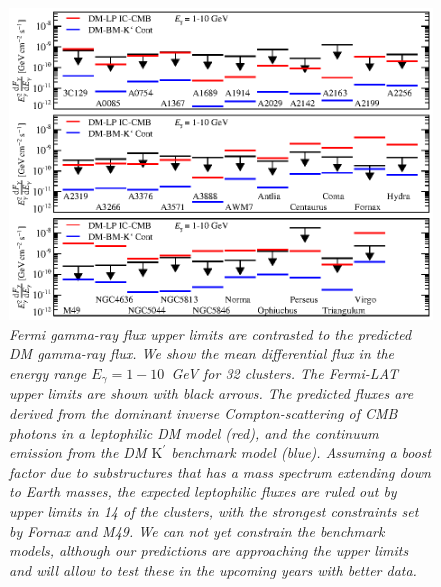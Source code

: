 \documentclass[10pt,aps,pra,reprint,amsmath,amsfonts,amssymb,showpacs,nofootinbib,floatfix]{revtex4-1}
\newcommand{\rmn}{\mathrm}
\newcommand{\Kp}{\rmn{K}^\prime}
\begin{document}
\begin{figure}
\begin{minipage}{2.0\columnwidth}
  \includegraphics[width=0.99\columnwidth]{figures/Fermi.comp.DM.eps}
  \caption{\it Fermi gamma-ray flux upper limits are contrasted to the
    predicted DM gamma-ray flux. We show the mean differential flux in
    the energy range $E_\gamma=1-10$~GeV for 32 clusters. The
    Fermi-LAT upper limits are shown with black arrows. The predicted
    fluxes are derived from the dominant inverse Compton-scattering of
    CMB photons in a leptophilic DM model (red), and the continuum
    emission from the DM $\Kp$ benchmark model (blue). Assuming a
    boost factor due to substructures that has a mass spectrum
    extending down to Earth masses, the expected leptophilic fluxes
    are ruled out by upper limits in 14 of the clusters, with the
    strongest constraints set by Fornax and M49. We can not yet
    constrain the benchmark models, although our predictions are
    approaching the upper limits and will allow to test these in the
    upcoming years with better data.}
 \label{fig14}
\end{minipage}
\end{figure}
\end{document}
